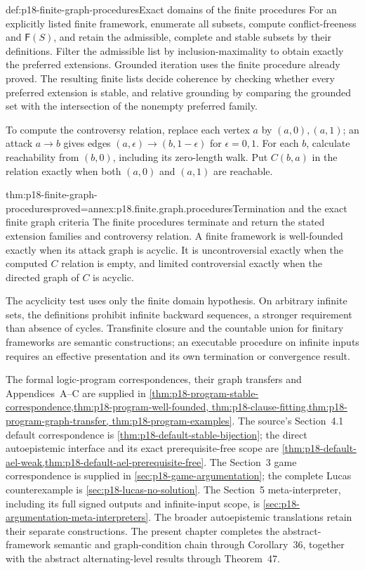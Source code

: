 \begin{hbmethod}{def:p18-finite-graph-procedures}{Exact domains of the finite procedures}
For an explicitly listed finite framework, enumerate
all subsets, compute conflict-freeness and
\(\mathsf F(S)\), and retain the admissible,
complete and stable subsets by their definitions.
Filter the admissible list by inclusion-maximality
to obtain exactly the preferred extensions.
Grounded iteration uses the finite procedure
already proved.
The resulting finite lists decide coherence
by checking whether every preferred extension
is stable, and relative grounding by comparing
the grounded set with the intersection of
the nonempty preferred family.

To compute the controversy relation, replace
each vertex \(a\) by \((a,0),(a,1)\);
an attack \(a\to b\) gives edges
\((a,\epsilon)\to(b,1-\epsilon)\) for
\(\epsilon=0,1\). For each \(b\), calculate
reachability from \((b,0)\), including its
zero-length walk. Put \(C(b,a)\) in the
relation exactly when both \((a,0)\)
and \((a,1)\) are reachable.
\end{hbmethod}

\begin{hbtheorem}{thm:p18-finite-graph-procedures}{proved=annex:p18.finite.graph.procedures}{Termination and the exact finite graph criteria}
The finite procedures terminate and return the
stated extension families and controversy relation.
A finite framework is well-founded exactly
when its attack graph is acyclic. It is
uncontroversial exactly when the computed
\(C\) relation is empty, and limited
controversial exactly when the directed graph
of \(C\) is acyclic.

The acyclicity test uses only the finite
domain hypothesis. On arbitrary infinite
sets, the definitions prohibit infinite
backward sequences, a stronger requirement
than absence of cycles. Transfinite closure
and the countable union for finitary
frameworks are semantic constructions;
an executable procedure on infinite inputs
requires an effective presentation and
its own termination or convergence result.
\end{hbtheorem}

The formal logic-program correspondences, their graph transfers and
Appendices~A--C are supplied in
\cref{thm:p18-program-stable-correspondence,thm:p18-program-well-founded,
thm:p18-clause-fitting,thm:p18-program-graph-transfer,
thm:p18-program-examples}. The source's Section~4.1 default correspondence
is \cref{thm:p18-default-stable-bijection}; the direct autoepistemic
interface and its exact prerequisite-free scope are
\cref{thm:p18-default-ael-weak,thm:p18-default-ael-prerequisite-free}.
The Section~3 game correspondence is supplied in
\cref{sec:p18-game-argumentation}; the complete Lucas counterexample
is \cref{sec:p18-lucas-no-solution}. The Section~5 meta-interpreter,
including its full signed outputs and infinite-input scope, is
\cref{sec:p18-argumentation-meta-interpreters}.
The broader autoepistemic translations retain their separate
constructions. The present
chapter completes the abstract-framework
semantic and graph-condition chain through
Corollary~36, together with the abstract
alternating-level results through Theorem~47.
